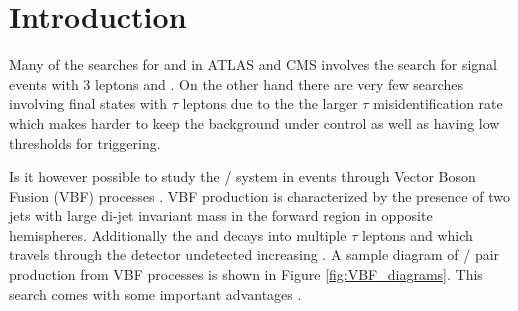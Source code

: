 \section {Introduction}

Many of the searches for \charginopm and \neutralinotwo in ATLAS \cite{Aad:2012hba, ATLAS:2012ab} and CMS \cite{Chatrchyan:2012mea} involves the search for signal events with 3 leptons and \met. On the other hand there are very few searches involving final states with $\tau$ leptons due to the the larger $\tau$ misidentification rate which makes harder to keep the background under control as well as having low \pt thresholds for triggering.

Is it however possible to study the \charginopm / \neutralinotwo system in events through Vector Boson Fusion (VBF) processes \cite{Bjorken:1992er}. VBF production is characterized by the presence of two jets with large di-jet invariant mass in the forward region in opposite hemispheres. Additionally the \charginopm and \neutralinotwo decays into multiple $\tau$ leptons and \neutralinoone which travels through the detector undetected increasing \met. A sample diagram of \charginopm / \neutralinotwo pair production from VBF processes is shown in Figure \ref{fig:VBF_diagrams}. This search comes with some important advantages \cite{Dutta:2012xe}.

